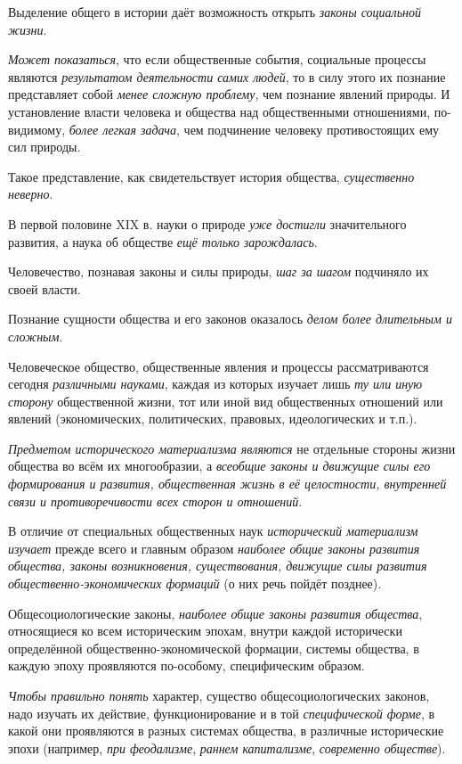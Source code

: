 \documentclass[a4paper,14pt,russian]{extreport}
\begin{document}
Выделение общего в истории даёт возможность открыть \emph{законы социальной жизни}.

\emph{Может показаться}, что если общественные события, социальные процессы являются \emph{результатом деятельности самих людей}, то в силу этого их познание представляет собой \emph{менее сложную проблему}, чем познание явлений природы. И установление власти человека и общества над общественными отношениями, по-видимому, \emph{более легкая задача}, чем подчинение человеку противостоящих ему сил природы.

Такое представление, как свидетельствует история общества, \emph{существенно неверно}.

В первой половине XIX в. науки о природе \emph{уже достигли} значительного развития, а наука об обществе \emph{ещё только} \emph{зарождалась}.

Человечество, познавая законы и силы природы, \emph{шаг за шагом} подчиняло их своей власти.

Познание сущности общества и его законов оказалось \emph{делом более длительным и сложным}.

Человеческое общество, общественные явления и процессы рассматриваются сегодня \emph{различными науками}, каждая из которых изучает лишь \emph{ту или иную сторону} общественной жизни, тот или иной вид общественных отношений или явлений (экономических, политических, правовых, идеологических и т.п.).

\emph{Предметом исторического материализма являются} не отдельные стороны жизни общества во всём их многообразии, а \emph{всеобщие законы и движущие силы его формирования и развития, общественная жизнь в её целостности, внутренней связи и противоречивости всех сторон и отношений}.

В отличие от специальных общественных наук \emph{исторический материализм изучает} прежде всего и главным образом \emph{наиболее общие законы развития общества, законы возникновения, существования, движущие силы развития общественно-экономических формаций} (о них речь пойдёт позднее)\emph{.}

Общесоциологические законы, \emph{наиболее общие законы развития общества}, относящиеся ко всем историческим эпохам, внутри каждой исторически определённой общественно-экономической формации, системы общества, в каждую эпоху проявляются по-особому, специфическим образом.

\emph{Чтобы правильно понять} характер, существо общесоциологических законов, надо изучать их действие, функционирование и в той \emph{специфической форме}, в какой они проявляются в разных системах общества, в различные исторические эпохи (например, \emph{при феодализме}, \emph{раннем капитализме}, \emph{современно обществе}).
\end{document}
